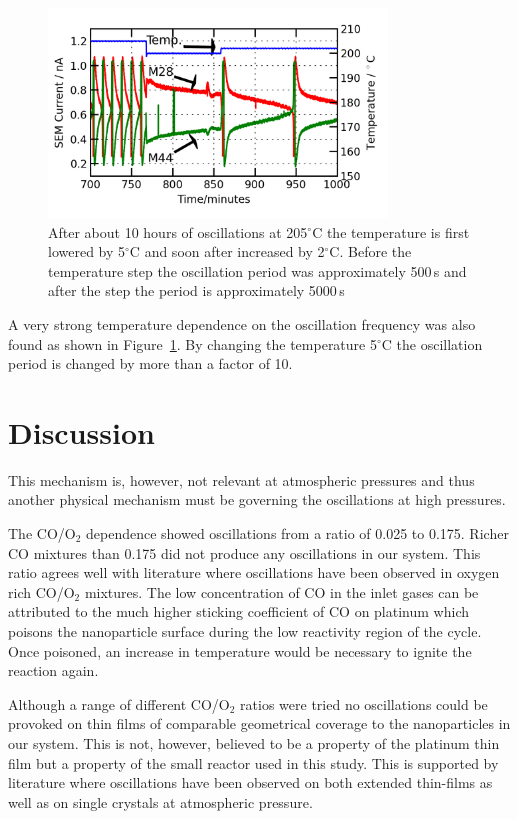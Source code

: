 \documentclass[8.5pt,twoside,twocolumn]{article}
\begin{document}
\begin{figure}[h]
\centering
  \includegraphics[width=9cm]{temperature_dependence.png}
  \caption{After about 10 hours of oscillations at 205$^\circ$C the temperature is first lowered by 5$^\circ$C and soon after increased by 2$^\circ$C. Before the temperature step the oscillation period was approximately 500\,s and after the step the period is approximately 5000\,s}
  \label{fgr:temperature_dependence}
\end{figure}
A very strong temperature dependence on the oscillation frequency was also found as shown in Figure~\ref{fgr:temperature_dependence}. By changing the temperature 5$^\circ$C the oscillation period is changed by more than a factor of 10.

\section{Discussion}
This mechanism is, however, not relevant at atmospheric pressures and thus another physical mechanism must be governing the oscillations at high pressures.

The CO/O$_2$ dependence showed oscillations from a ratio of 0.025 to 0.175. Richer CO mixtures than 0.175 did not produce any oscillations in our system. This ratio agrees well with literature \cite{Singh2010,Hendriksen2005} where oscillations have been observed in oxygen rich CO/O$_2$ mixtures. The low concentration of CO in the inlet gases can be attributed to the much higher sticking coefficient of CO on platinum which poisons the nanoparticle surface during the low reactivity region of the cycle. Once poisoned, an increase in temperature would be necessary to ignite the reaction again.

Although a range of different CO/O$_2$ ratios were tried no oscillations could be provoked on thin films of comparable geometrical coverage to the nanoparticles in our system. This is not, however, believed to be a property of the platinum thin film but a property of the small reactor used in this study. This is supported by literature where oscillations have been observed on both extended thin-films \cite{Singh2010} as well as on single crystals \cite{Hendriksen2005} at atmospheric pressure.
\end{document}
